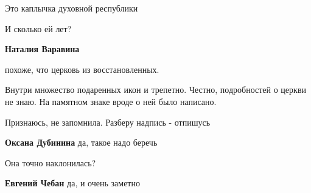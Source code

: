  
 
 
 
 

Это каплычка духовной республики

И сколько ей лет?

\textbf{Наталия Варавина} 

похоже, что церковь из восстановленных.

Внутри множество подаренных икон и трепетно. Честно, подробностей о церкви не
знаю. На памятном знаке вроде о ней было написано.

Признаюсь, не запомнила. Разберу надпись - отпишусь

\textbf{Оксана Дубинина} да, такое надо беречь

Она точно наклонилась?

\textbf{Евгений Чебан} да, и очень заметно
